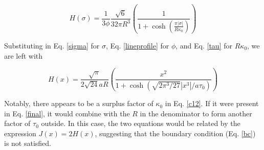 \documentclass[onecolumn]{aastex63}
\begin{document}
\begin{equation}
    H(\sigma) = \frac{1}{3 \phi} \frac{\sqrt{6}}{32 \pi R^3} \left(\frac{1}{1 + \cosh{\left(\frac{\pi |\sigma|}{R\kappa_0}\right)}}\right)
\end{equation}

Substituting in Eq. \ref{sigma} for $\sigma$, Eq. \ref{lineprofile} for $\phi$, and Eq. \ref{tau} for $R \kappa_0$, we are left with

\begin{equation} \label{final}
    H(x) = \frac{\sqrt{\pi}}{2\sqrt{24}aR} \left(\frac{x^2}{1 + \cosh{\left(\sqrt{2\pi^3/27}|x^3|/a\tau_0\right)}}\right)
\end{equation}

Notably, there appears to be a surplus factor of $\kappa_0$ in Eq. \ref{c12}. If it were present in Eq. \ref{final}, it would combine with the $R$ in the denominator to form another factor of $\tau_0$ outside. In this case, the two equations would be related by the expression $J(x) = 2 H(x)$, suggesting that the boundary condition (Eq. \ref{bc}) is not satisfied.

{}

\end{document}
